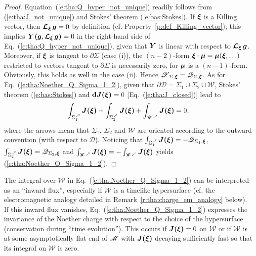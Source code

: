\begin{proof}
Equation~(\ref{e:tha:Q_hyper_not_unique}) readily follows from (\ref{e:tha:J_not_unique}) and
Stokes' theorem (\ref{e:bas:Stokes}). If $\bm{\xi}$ is a Killing vector, then
$\bm{\mathcal{L}}_{\bm{\xi}}\,\bm{g}= 0$ by definition (cf. Property~\ref{p:def_Killing_vector}); this implies
$\bm{Y}\textbf{(}\bm{g},\bm{\mathcal{L}}_{\bm{\xi}}\,\bm{g}\textbf{)} = 0$ in the
right-hand side of Eq.~(\ref{e:tha:Q_hyper_not_unique}), given that
$\bm{Y}$ is linear with respect to $\bm{\mathcal{L}}_{\bm{\xi}}\,\bm{g}$.
Moreover, if $\bm{\xi}$ is tangent to $\partial\Sigma$ (case (i)), the $(n-2)$-form
$\bm{\xi}\cdot\bm{\mu} = \bm{\mu}(\bm{\xi},\ldots)$ restricted to vectors tangent to $\partial\Sigma$
is necessarily zero, for $\bm{\mu}$ is a $(n-1)$-form. Obviously, this holds as well in the case (ii).
Hence
$\mathscr{Q'}_{\Sigma,\bm{\xi}} = \mathscr{Q}_{\Sigma,\bm{\xi}}$.
As for Eq.~(\ref{e:tha:Noether_Q_Sigma_1_2}),
given that $\partial\mathscr{D} = \Sigma_1\cup\Sigma_2\cup\mathscr{W}$, Stokes' theorem (\ref{e:bas:Stokes})
and $\mathbf{d} \bm{J}\textbf{(}\bm{\xi}\textbf{)} = 0$ [Eq.~(\ref{e:tha:J_closed})] lead to
\[
     \int_{\Sigma_1^{\nearrow}} \bm{J}\textbf{(}\bm{\xi}\textbf{)} + \int_{\Sigma_2^{\nearrow}} \bm{J}\textbf{(}\bm{\xi}\textbf{)}
      + \int_{\mathscr{W}^{\nearrow}} \bm{J}\textbf{(}\bm{\xi}\textbf{)} = 0 ,
\]
where the arrows mean that $\Sigma_1$, $\Sigma_2$ and $\mathscr{W}$ are oriented according to the outward
convention (with respect to $\mathscr{D}$).
Noticing that $\int_{\Sigma_1^{\nearrow}} \bm{J}\textbf{(}\bm{\xi}\textbf{)} = -\mathscr{Q}_{\Sigma_1,\bm{\xi}}$,
$\int_{\Sigma_2^{\nearrow}} \bm{J}\textbf{(}\bm{\xi}\textbf{)} = \mathscr{Q}_{\Sigma_2,\bm{\xi}}$
and $\int_{\mathscr{W}^{\nearrow}} \bm{J}\textbf{(}\bm{\xi}\textbf{)} = - \int_{\mathscr{W}^{\swarrow}} \bm{J}\textbf{(}\bm{\xi}\textbf{)}$
yields (\ref{e:tha:Noether_Q_Sigma_1_2}).
\end{proof}

The integral over $\mathscr{W}$ in Eq.~(\ref{e:tha:Noether_Q_Sigma_1_2}) can be interpreted as
an ``inward flux'', especially if $\mathscr{W}$ is a timelike hypersurface
(cf. the electromagnetic analogy detailed in Remark~\ref{r:tha:charge_em_analogy} below).
If this inward flux vanishes,
Eq.~(\ref{e:tha:Noether_Q_Sigma_1_2}) expresses the
invariance of the Noether charge with respect to the choice of the hypersurface
(conservation during ``time evolution''). This occurs
if $\bm{J}\textbf{(}\bm{\xi}\textbf{)} = 0$ on $\mathscr{W}$ or if  $\mathscr{W}$ is at some asymptotically flat end
of $\mathscr{M}$ with $\bm{J}\textbf{(}\bm{\xi}\textbf{)}$ decaying sufficiently fast so that its integral on $\mathscr{W}$ is zero.

